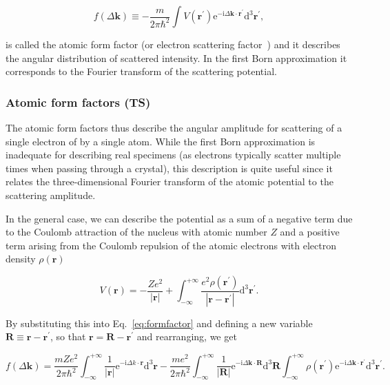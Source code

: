 \documentclass[%
 superscriptaddress,
 aip,
 amsmath,amssymb,
preprint,%
 author-year,%
longbibliography
]{revtex4-2}
\begin{document}
\begin{equation}
f(\Delta \bm{k}) \equiv-\frac{m}{2 \pi \hbar^{2}} \int V\left(\bm{r}^{\prime}\right) \mathrm{e}^{-\mathrm{i} \Delta \bm{k} \cdot \bm{r}^{\prime}} \mathrm{d}^{3} \bm{r}^{\prime},\label{eq:formfactor}
\end{equation}

is called the atomic form factor (or electron scattering factor~\cite{kirkland_advanced_2010}) and it describes the angular distribution of scattered intensity. In the first Born approximation it corresponds to the Fourier transform of the scattering potential.%

\subsubsection*{Atomic form factors (TS)}

The atomic form factors thus describe the angular amplitude for scattering of a single electron of by a single atom. While the first Born approximation is  inadequate for describing real specimens (as electrons typically scatter multiple times when passing through a crystal), this description is quite useful since it relates the three-dimensional Fourier transform of the atomic potential to the scattering amplitude.

In the general case, we can describe the potential as a sum of a negative term due to the Coulomb attraction of the nucleus with atomic number $Z$ and a positive term arising from the Coulomb repulsion of the atomic electrons with electron density $\rho(\bm{r})$

\begin{equation}
V(\bm{r})=-\frac{Z e^{2}}{|\bm{r}|}+\int_{-\infty}^{+\infty} \frac{e^{2} \rho\left(\bm{r}^{\prime}\right)}{\left|\bm{r}-\bm{r}^{\prime}\right|} \mathrm{d}^{3} \bm{r}^{\prime}.
\end{equation}

By substituting this into Eq.~\ref{eq:formfactor} and defining a new variable $\bm{R} \equiv \bm{r} - \bm{r}^{\prime}$, so that $\bm{r} = \bm{R} - \bm{r}^{\prime}$ and rearranging, we get

\begin{equation}
f(\Delta \bm{k})=\frac{m Z e^{2}}{2 \pi \hbar^{2}} \int_{-\infty}^{+\infty} \frac{1}{|\bm{r}|} \mathrm{e}^{-\mathrm{i} \Delta k \cdot \bm{r}} \mathrm{d}^{3} \bm{r} -\frac{m e^{2}}{2 \pi \hbar^{2}} \int_{-\infty}^{+\infty} \frac{1}{|\bm{R}|} \mathrm{e}^{-\mathrm{i} \Delta \bm{k} \cdot \bm{R}} \mathrm{d}^{3} \bm{R} \int_{-\infty}^{+\infty} \rho\left(\bm{r}^{\prime}\right) \mathrm{e}^{-\mathrm{i} \Delta \bm{k} \cdot \bm{r}^{\prime}} \mathrm{d}^{3} \bm{r}^{\prime}.
\end{equation}
\end{document}
